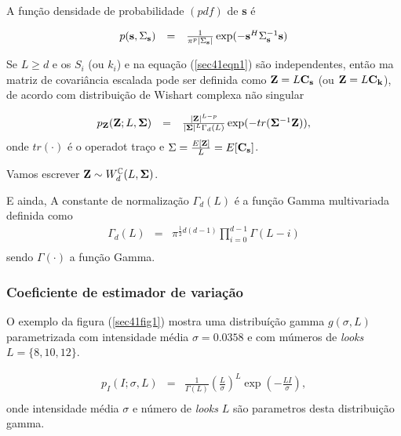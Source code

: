 \documentclass[10pt,a4paper]{article}
\begin{document}
A função densidade de probabilidade $(pdf)$ de {\bf s} é 

\begin{equation}\label{sec41eqn3}
\begin{array}{ccc}
	p({\bf s},\Sigma_{\bf s})&=&\frac{1}{\pi^p|\Sigma_{{\bf s}}|}\exp(-{\bf s}^{H}\Sigma_{{\bf s}}^{-1}{\bf s})  \\
\end{array}
\end{equation}

Se $L\geq d$ e os {\bf $S_i$} (ou {\bf $k_i$}) e na equação (\ref{sec41eqn1}) são independentes, então ma matriz de covariância escalada pode ser definida como ${\bf Z}=L{\bf C_{\bf s}}$ (ou ${\bf Z}=L{\bf C_{\bf k}}$), de acordo com distribuição de Wishart complexa não singular \cite{goodman1963}

\begin{equation}\label{sec41eqn4}
\begin{array}{ccc}
	p_{{\bf Z}}({\bf Z};L,{\bf \Sigma})&=&\frac{|{\bf Z}|^{L-p}}{|{\bf \Sigma}|^{L}\Gamma_d(L)} \exp(-tr({\bf \Sigma}^{-1}{\bf Z})), \\
\end{array}
\end{equation}
onde $tr(\cdot)$ é o operadot traço e ${\Sigma}=\frac{E[{\bf Z}]}{L}=E[{\bf C_{s}}]$. 

Vamos escrever ${\bf Z}\sim W_d^{\mathbb C}(L, {\bf \Sigma})$.

E ainda, A constante de normalização $\Gamma_d(L)$ é a função Gamma multivariada definida como 
\begin{equation}\label{sec41eqn5}
\begin{array}{ccc}
	\Gamma_d(L)&=&\pi^{\frac{1}{2}d(d-1)} \displaystyle{\prod_{i=0}^{d-1}\Gamma(L-i)} \\
\end{array}
\end{equation}
sendo $\Gamma(\cdot)$ a função Gamma.

\subsubsection{Coeficiente de estimador de variação}

 O exemplo da figura (\ref{sec41fig1}) mostra uma distribuíção gamma $g(\sigma, L)$ parametrizada com intensidade média $\sigma=0.0358$ e com múmeros de {\it looks} $L=\{8,10,12\}$.

\begin{equation}\label{sec41eqn6}
\begin{array}{ccc}
	p_{I}(I;\sigma,L)&=&\frac{1}{\Gamma(L)}\left(\frac{L}{\sigma}\right)^L \exp(-\frac{LI}{\sigma}), \\
\end{array}
\end{equation}
onde intensidade média $\sigma$ e número de {\it looks} $L$ são parametros desta distribuição gamma.
\end{document}
